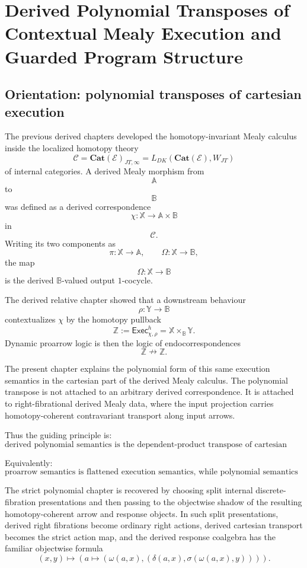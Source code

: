 \chapter{\texorpdfstring{Derived Polynomial Transposes of Contextual Mealy Execution and Guarded Program Structure}{Derived Polynomial Transposes of Contextual Mealy Execution and Guarded Program Structure}}
\label{ch:derived-polynomial-contextual-mealy}

\section{Orientation: polynomial transposes of cartesian execution}
\label{sec:derived-poly-orientation}

The previous derived chapters developed the homotopy-invariant Mealy calculus
inside the localized homotopy theory
\[
\mathcal C
=
\mathbf{Cat}(\mathcal E)_{JT,\infty}
=
L_{DK}(\mathbf{Cat}(\mathcal E),W_{JT})
\]
of internal categories.  A derived Mealy morphism from
\[
\mathbb A
\]
to
\[
\mathbb B
\]
was defined as a derived correspondence
\[
\chi:\mathbb X\to\mathbb A\times\mathbb B
\]
in
\[
\mathcal C.
\]
Writing its two components as
\[
\pi:\mathbb X\to\mathbb A,
\qquad
\Omega:\mathbb X\to\mathbb B,
\]
the map
\[
\Omega:\mathbb X\to\mathbb B
\]
is the derived \(\mathbb B\)-valued output \(1\)-cocycle.

The derived relative chapter showed that a downstream behaviour
\[
\rho:\mathbb Y\to\mathbb B
\]
contextualizes \(\chi\) by the homotopy pullback
\[
\mathbb Z
:=
\mathsf{Exec}^h_{\chi,\rho}
=
\mathbb X\times_{\mathbb B}\mathbb Y.
\]
Dynamic proarrow logic is then the logic of endocorrespondences
\[
\mathbb Z\nrightarrow\mathbb Z.
\]

The present chapter explains the polynomial form of this same execution
semantics in the cartesian part of the derived Mealy calculus.  The polynomial
transpose is not attached to an arbitrary derived correspondence.  It is
attached to right-fibrational derived Mealy data, where the input projection
carries homotopy-coherent contravariant transport along input arrows.

Thus the guiding principle is:
\[
\boxed{
\text{derived polynomial semantics is the dependent-product transpose of
cartesian contextual Mealy execution.}
}
\]

Equivalently:
\[
\boxed{
\text{proarrow semantics is flattened execution semantics, while polynomial
semantics is curried total-response semantics.}
}
\]

The strict polynomial chapter is recovered by choosing split internal
discrete-fibration presentations and then passing to the objectwise shadow of
the resulting homotopy-coherent arrow and response objects.  In such split
presentations, derived right fibrations become ordinary right actions, derived
cartesian transport becomes the strict action map, and the derived response
coalgebra has the familiar objectwise formula
\[
(x,y)
\longmapsto
\left(
a
\longmapsto
\left(
\omega(a,x),
\left(
\delta(a,x),\sigma(\omega(a,x),y)
\right)
\right)
\right).
\]

